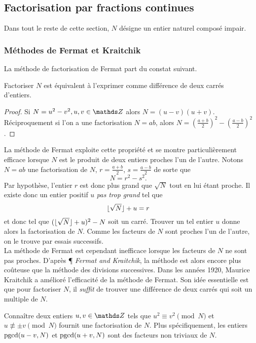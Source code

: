 \subsection{Factorisation par fractions continues}

Dans tout le reste de cette section, $N$ désigne un entier naturel composé impair.

\subsubsection{Méthodes de Fermat et Kraitchik}

La méthode de factorisation de Fermat part du constat suivant.

\begin{lemme}
	Factoriser $N$ est équivalent à l'exprimer comme différence de deux carrés
	d'entiers.
\end{lemme}

\begin{proof}
	Si $N = u^2 - v^2, u, v\in \Z$ alors $N = (u-v)(u + v)$. Réciproquement si
	l'on a une factorisation $N = ab$, alors $N = \left(\frac{a+b}{2}\right)^2
	- \left(\frac{a-b}{2}\right)^2$.
\end{proof}

La méthode de Fermat exploite cette propriété et se montre particulièrement
efficace lorsque $N$ est le produit de deux entiers proches l'un de l'autre.
Notons $N=ab$ une factorisation de $N$, $r=\frac{a+b}{2}$, $s=\frac{a-b}{2}$ de
sorte que \[N = r^2 - s^2.\] Par hypothèse, l'entier $r$ est donc plus grand
que $\sqrt{N}$ tout en lui étant proche. Il existe donc un entier positif $u$
\emph{pas trop grand} tel que \[\lfloor\sqrt{N}\rfloor + u = r\] et donc tel que
$(\lfloor\sqrt{N}\rfloor + u)^2 - N$ soit un carré. Trouver un tel entier $u$ donne
alors la factorisation de $N$. Comme les facteurs de $N$ sont proches l'un de
l'autre, on le trouve par essais successifs. \\

La méthode de Fermat est cependant inefficace lorsque les facteurs de $N$ ne
sont pas proches. D'après \cite{Tale} ¶ \emph{Fermat and Kraitchik}, la méthode
est alors encore plus coûteuse que la méthode des divisions successives. Dans
les années 1920, Maurice Kraitchik a amélioré l'efficacité de la méthode de
Fermat. Son idée essentielle est que pour factoriser $N$, il \emph{suffit} de
trouver une différence de deux carrés qui soit un multiple de $N$.

\begin{lemme}
	Connaître deux entiers $u, v \in \Z$ tels que $u^2 \equiv v^2 
	\pmod{N}$ et $u\not\equiv \pm v\pmod{N}$ fournit une factorisation de $N$.
	Plus spécifiquement, les entiers $\operatorname{pgcd}(u-v, N)$ et $\operatorname{pgcd}(u+v, N)$ sont
	des facteurs non triviaux de $N$.
\end{lemme}

